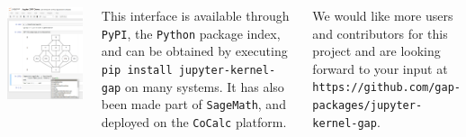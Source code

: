 \documentclass[14pt, a1paper, portrait, margin=0mm, innermargin=5mm, blockverticalspace=7mm, colspace=5mm, subcolspace=8mm]{tikzposter}
\begin{document}
\begin{columns}
{    \begin{tikzfigure}
      \includegraphics[width=15cm]{img/jupyter-demo-2.png}
    \end{tikzfigure}


    \medskip

    This interface is available through \texttt{PyPI}, the \texttt{Python}
    package index, and can be obtained by executing \texttt{pip install
      jupyter-kernel-gap} on many systems.
    It has also been made part of \texttt{SageMath}, and deployed on the
    \texttt{CoCalc} platform.

    \medskip

    We would like more users and contributors for this project and are looking
    forward to your input at \texttt{https://github.com/gap-packages/jupyter-kernel-gap}.
  }
\end{columns}
\end{document}
